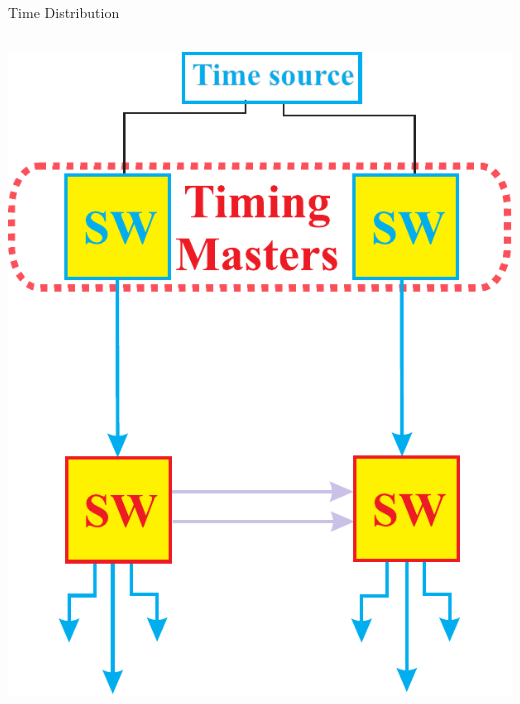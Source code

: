 \documentclass[compress,red]{beamer}
\begin{document}
\begin{frame}{Time Distribution}
\begin{columns}[c]
      \begin{center}
	\includegraphics[width=1.1\textwidth]{robustness/WRPTPmodif_1.pdf}
      \end{center}  
    

  \end{columns}

\end{frame}
\end{document}
